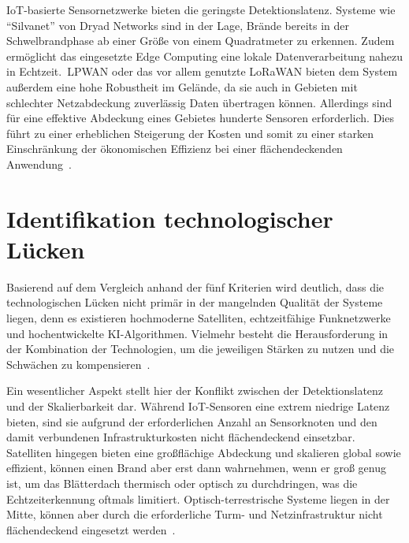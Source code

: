 \acs{IoT}-basierte Sensornetzwerke bieten die geringste Detektionslatenz. Systeme wie \enquote{Silvanet} von Dryad Networks sind in der Lage, Brände bereits in der Schwelbrandphase ab einer Größe von einem Quadratmeter zu erkennen. Zudem ermöglicht das eingesetzte Edge Computing eine lokale Datenverarbeitung nahezu in Echtzeit.~\acs{LPWAN} oder das vor allem genutzte \acs{LoRaWAN} bieten dem System außerdem eine hohe Robustheit im Gelände, da sie auch in Gebieten mit schlechter Netzabdeckung zuverlässig Daten übertragen können. Allerdings sind für eine effektive Abdeckung eines Gebietes hunderte Sensoren erforderlich. Dies führt zu einer erheblichen Steigerung der Kosten und somit zu einer starken Einschränkung der ökonomischen Effizienz bei einer flächendeckenden Anwendung~\cite{Chan2024,Kumar2023, Nodes.sh2024}.

\chapter{Identifikation technologischer Lücken}\label{ch:identifikationTechnologischerLuecken}

Basierend auf dem Vergleich anhand der fünf Kriterien wird deutlich, dass die technologischen Lücken nicht primär in der mangelnden Qualität der Systeme liegen, denn es existieren hochmoderne Satelliten, echtzeitfähige Funknetzwerke und hochentwickelte KI-Algorithmen. Vielmehr besteht die Herausforderung in der Kombination der Technologien, um die jeweiligen Stärken zu nutzen und die Schwächen zu kompensieren~\cite{Chan2024}.

Ein wesentlicher Aspekt stellt hier der Konflikt zwischen der Detektionslatenz und der Skalierbarkeit dar. Während \acs{IoT}-Sensoren eine extrem niedrige Latenz bieten, sind sie aufgrund der erforderlichen Anzahl an Sensorknoten und den damit verbundenen Infrastrukturkosten nicht flächendeckend einsetzbar. Satelliten hingegen bieten eine großflächige Abdeckung und skalieren global sowie effizient, können einen Brand aber erst dann wahrnehmen, wenn er groß genug ist, um das Blätterdach thermisch oder optisch zu durchdringen, was die Echtzeiterkennung oftmals limitiert. Optisch-terrestrische Systeme liegen in der Mitte, können aber durch die erforderliche Turm- und Netzinfrastruktur nicht flächendeckend eingesetzt werden~\cite{Allison2016}.

